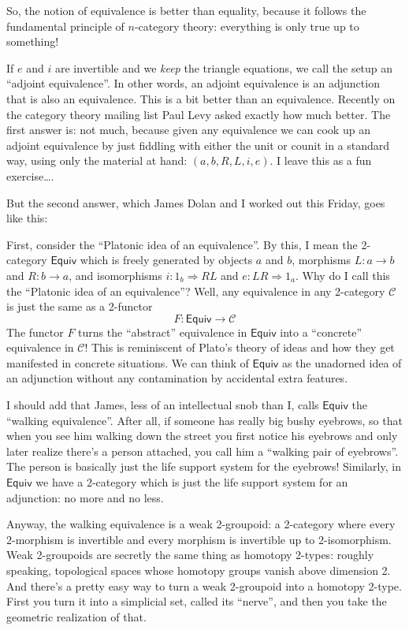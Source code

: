 \documentclass{article}
\begin{document}
So, the notion of equivalence is better than equality, because it
follows the fundamental principle of \(n\)-category theory: everything
is only true up to something!

If \(e\) and \(i\) are invertible and we \emph{keep} the triangle
equations, we call the setup an ``adjoint equivalence''. In other words,
an adjoint equivalence is an adjunction that is also an equivalence.
This is a bit better than an equivalence. Recently on the category
theory mailing list Paul Levy asked exactly how much better. The first
answer is: not much, because given any equivalence we can cook up an
adjoint equivalence by just fiddling with either the unit or counit in a
standard way, using only the material at hand: \((a,b,R,L,i,e)\). I
leave this as a fun exercise\ldots.

But the second answer, which James Dolan and I worked out this Friday,
goes like this:

First, consider the ``Platonic idea of an equivalence''. By this, I mean
the 2-category \(\mathsf{Equiv}\) which is freely generated by objects
\(a\) and \(b\), morphisms \(L\colon a \to b\) and \(R\colon b \to a\),
and isomorphisms \(i\colon 1_b \Rightarrow RL\) and
\(e\colon LR \Rightarrow 1_a\). Why do I call this the ``Platonic idea
of an equivalence''? Well, any equivalence in any 2-category
\(\mathcal{C}\) is just the same as a 2-functor
\[F\colon \mathsf{Equiv} \to \mathcal{C}\] The functor \(F\) turns the
``abstract'' equivalence in \(\mathsf{Equiv}\) into a ``concrete''
equivalence in \(\mathcal{C}\)! This is reminiscent of Plato's theory of
ideas and how they get manifested in concrete situations. We can think
of \(\mathsf{Equiv}\) as the unadorned idea of an adjunction without any
contamination by accidental extra features.

I should add that James, less of an intellectual snob than I, calls
\(\mathsf{Equiv}\) the ``walking equivalence''. After all, if someone
has really big bushy eyebrows, so that when you see him walking down the
street you first notice his eyebrows and only later realize there's a
person attached, you call him a ``walking pair of eyebrows''. The person
is basically just the life support system for the eyebrows! Similarly,
in \(\mathsf{Equiv}\) we have a 2-category which is just the life
support system for an adjunction: no more and no less.

Anyway, the walking equivalence is a weak 2-groupoid: a 2-category where
every 2-morphism is invertible and every morphism is invertible up to
2-isomorphism. Weak 2-groupoids are secretly the same thing as homotopy
2-types: roughly speaking, topological spaces whose homotopy groups
vanish above dimension 2. And there's a pretty easy way to turn a weak
2-groupoid into a homotopy 2-type. First you turn it into a simplicial
set, called its ``nerve'', and then you take the geometric realization
of that.
\end{document}
